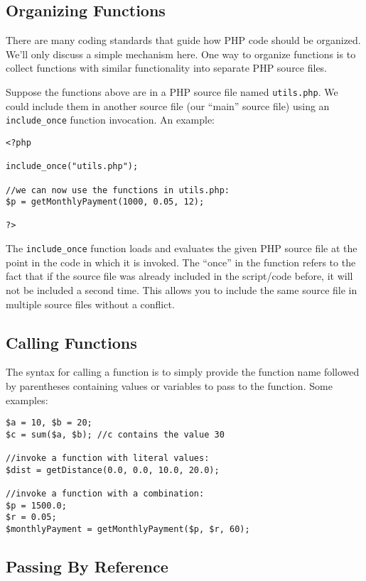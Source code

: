 \subsection{Organizing Functions}

There are many coding standards that guide how PHP code
should be organized.  We'll only discuss a simple mechanism 
here.  One way to organize functions is to collect functions
with similar functionality into separate PHP source files.  

Suppose the functions above are in a PHP source file named 
\texttt{utils.php}.  We could include them in another
source file (our ``main'' source file) using an \texttt{include_once}
function invocation.  An example:

\begin{verbatim}
<?php

include_once("utils.php");

//we can now use the functions in utils.php:
$p = getMonthlyPayment(1000, 0.05, 12);

?>
\end{verbatim}

The \texttt{include_once} function loads and
evaluates the given PHP source file at the point in the code in which
it is invoked.  The ``once'' in the function refers to the fact that if
the source file was already included in the script/code before, it will
not be included a second time.  This allows you to include the same
source file in multiple source files without a conflict.

\subsection{Calling Functions}

The syntax for calling a function is to simply provide the function 
name followed by parentheses containing values or variables 
to pass to the function.  Some examples:

\begin{verbatim}
$a = 10, $b = 20;
$c = sum($a, $b); //c contains the value 30

//invoke a function with literal values:
$dist = getDistance(0.0, 0.0, 10.0, 20.0);

//invoke a function with a combination:
$p = 1500.0;
$r = 0.05;
$monthlyPayment = getMonthlyPayment($p, $r, 60);
\end{verbatim}

\subsection{Passing By Reference}

